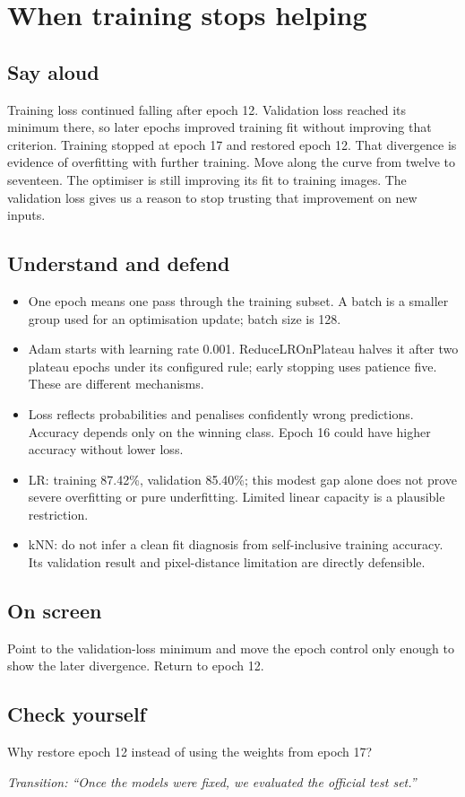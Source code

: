 \documentclass[11pt,a4paper]{article}
\newcommand{\slide}[3]{\clearpage{\small\color{olive}SLIDE #1\hfill Target: #3}\par\section{#2}}
\newcommand{\say}{\subsection{Say aloud}}
\newcommand{\understand}{\subsection{Understand and defend}}
\newcommand{\screen}{\subsection{On screen}}
\newcommand{\selfcheck}[1]{\subsection{Check yourself}#1}
\newcommand{\transition}[1]{\par\smallskip\textit{Transition: #1}}
\begin{document}
\slide{10}{When training stops helping}{35 seconds}
\say
Training loss continued falling after epoch 12. Validation loss reached its minimum there, so later epochs improved training fit without improving that criterion. Training stopped at epoch 17 and restored epoch 12. That divergence is evidence of overfitting with further training. Move along the curve from twelve to seventeen. The optimiser is still improving its fit to training images. The validation loss gives us a reason to stop trusting that improvement on new inputs.
\understand
\begin{itemize}
\item One epoch means one pass through the training subset. A batch is a smaller group used for an optimisation update; batch size is 128.
\item Adam starts with learning rate 0.001. ReduceLROnPlateau halves it after two plateau epochs under its configured rule; early stopping uses patience five. These are different mechanisms.
\item Loss reflects probabilities and penalises confidently wrong predictions. Accuracy depends only on the winning class. Epoch 16 could have higher accuracy without lower loss.
\item LR: training 87.42\%, validation 85.40\%; this modest gap alone does not prove severe overfitting or pure underfitting. Limited linear capacity is a plausible restriction.
\item kNN: do not infer a clean fit diagnosis from self-inclusive training accuracy. Its validation result and pixel-distance limitation are directly defensible.
\end{itemize}
\screen
Point to the validation-loss minimum and move the epoch control only enough to show the later divergence. Return to epoch 12.
\selfcheck{Why restore epoch 12 instead of using the weights from epoch 17?}
\transition{``Once the models were fixed, we evaluated the official test set.''}
\end{document}
